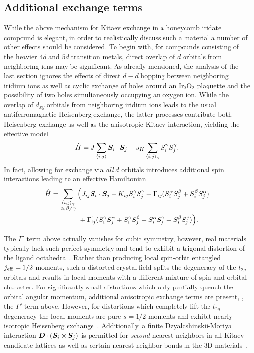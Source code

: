 \subsection{Additional exchange terms}
%
%
While the above mechanism for Kitaev exchange in a honeycomb iridate compound is elegant, in order to realistically discuss such a material a number of other effects should be considered.
To begin with, for compounds consisting of the heavier $4d$ and $5d$ transition metals, direct overlap of $d$ orbitals from neighboring ions may be significant.
As already mentioned, the analysis of the last section ignores the effects of direct $d-d$ hopping between neighboring iridium ions as well as cyclic exchange of holes around an Ir$_2$O$_2$ plaquette and the possibility of two holes simultaneously occupying an oxygen ion.
While the overlap of $d_{xy}$ orbitals from neighboring iridium ions leads to the usual antiferromagnetic Heisenberg exchange, the latter processes contribute both Heisenberg exchange as well as the anisotropic Kitaev interaction, yielding the effective model~\cite{ChaloupkaPRL2010}
%
\begin{equation}
	\hat{H} = J \sum_{\langle i,j \rangle} \bm{S}_i \cdot \bm{S}_j - J_K \sum_{\langle i,j \rangle_{\gamma}} S^{\gamma}_i S^{\gamma}_j.
\end{equation}
%
In fact, allowing for exchange via \textit{all} $d$ orbitals introduces additional spin interactions leading to an effective Hamiltonian~\cite{WinterPRB2016,RauPRL2014}
%
\begin{align}
	\hat{H} 	&= \sum_{\substack{\langle i,j \rangle_{\gamma}\\ \alpha,\beta \neq \gamma}} \Big(J_{ij} \bm{S}_i \cdot \bm{S}_j + K_{ij} S^{\gamma}_i S^{\gamma}_j + \Gamma_{ij} (S^{\alpha}_i S^{\beta}_j + S^{\beta}_i S^{\alpha}_j) \nonumber\\
			&\qquad\qquad+ \Gamma'_{ij} (S^{\gamma}_i S^{\alpha}_j + S^{\gamma}_i S^{\beta}_j + S^{\alpha}_i S^{\gamma}_j + S^{\beta}_i S^{\gamma}_j)\Big).
\end{align}
%

The $\Gamma'$ term above actually vanishes for cubic symmetry, however, real materials typically lack such perfect symmetry and tend to exhibit a trigonal distortion of the ligand octahedra~\cite{WinterJOP2017}.
Rather than producing local spin-orbit entangled $j_{\rm eff} = 1/2$ moments, such a distorted crystal field splits the degeneracy of the $t_{2g}$ orbitals and results in local moments with a different mixture of spin and orbital character.
For significantly small distortions which only partially quench the orbital angular momentum, additional anisotropic exchange terms are present, \eg, the $\Gamma'$ term above.
However, for distortions which completely lift the $t_{2g}$ degeneracy the local moments are pure $s = 1/2$ moments and exhibit nearly isotropic Heisenberg exchange~\cite{WinterJOP2017}.
Additionally, a finite Dzyaloshinskii-Moriya interaction $\bm{D}\cdot(\bm{S}_i \times \bm{S}_j)$ is permitted for \textit{second}-nearest neighbors in all Kitaev candidate lattices as well as certain nearest-neighbor bonds in the 3D materials~\cite{WinterPRB2016}.


